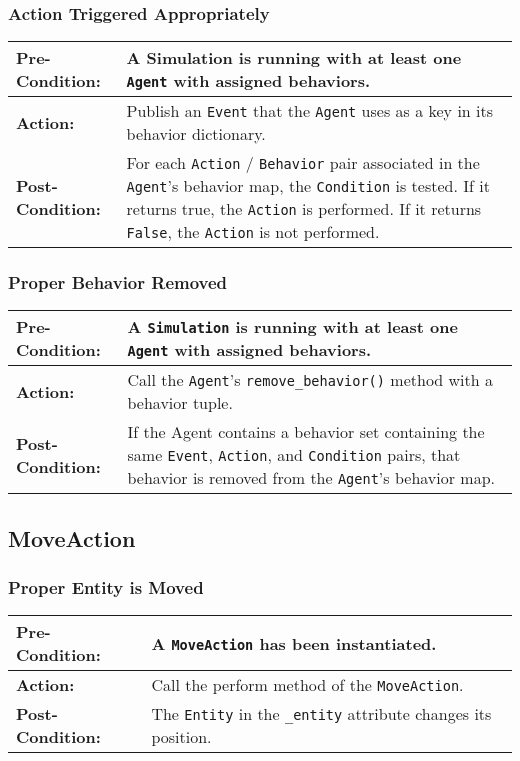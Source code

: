 \documentclass[titlepage]{article}
\newcommand{\testcase}[3]{
    \begin{center}
    \begin{tabular}{| l | p{0.7\textwidth}|}
        \hline
        \rowcolor[gray]{0.8}\textbf{Pre-Condition:} & #1 \\ \hline
        \textbf{Action:} & #2 \\ \hline
        \rowcolor[gray]{0.8}\textbf{Post-Condition:} & #3 \\ \hline
    \end{tabular}
    \end{center}
}
\begin{document}
\subsubsection{Action Triggered Appropriately}
\testcase{A Simulation is running with at least one \texttt{Agent} with assigned behaviors.}{Publish an \texttt{Event} that the \texttt{Agent} uses as a key in its behavior dictionary.}{For each \texttt{Action} / \texttt{Behavior} pair associated in the \texttt{Agent}'s behavior map, the \texttt{Condition} is tested.  If it returns true, the \texttt{Action} is performed.  If it returns \texttt{False}, the \texttt{Action} is not performed.}

\subsubsection{Proper Behavior Removed}
\testcase{A \texttt{Simulation} is running with at least one \texttt{Agent} with assigned behaviors.}{Call the \texttt{Agent}'s \texttt{remove\_behavior()} method with a behavior tuple.}{If the Agent contains a behavior set containing the same \texttt{Event}, \texttt{Action}, and \texttt{Condition} pairs, that behavior is removed from the \texttt{Agent}'s behavior map.}



\subsection{MoveAction}
\subsubsection{Proper Entity is Moved}
\testcase{A \texttt{MoveAction} has been instantiated.}{Call the perform method of the \texttt{MoveAction}.}{The \texttt{Entity} in the \texttt{\_entity} attribute changes its position.}
\end{document}
